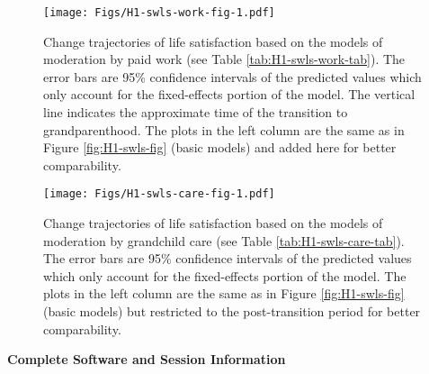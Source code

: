 \documentclass[
  english,
  man, noextraspace]{apa7}
\begin{document}
\begin{appendix}
\begin{figure}
\centering
\texttt{[image: Figs/H1-swls-work-fig-1.pdf]}
\caption{\label{fig:H1-swls-work-fig}Change trajectories of life satisfaction
based on the models of moderation by paid work (see Table
\ref{tab:H1-swls-work-tab}). The error bars are 95\% confidence
intervals of the predicted values which only account for the
fixed-effects portion of the model. The vertical line indicates the
approximate time of the transition to grandparenthood. The plots in the
left column are the same as in Figure \ref{fig:H1-swls-fig} (basic
models) and added here for better comparability.}
\end{figure}









\begin{figure}
\centering
\texttt{[image: Figs/H1-swls-care-fig-1.pdf]}
\caption{\label{fig:H1-swls-care-fig}Change trajectories of life satisfaction
based on the models of moderation by grandchild care (see Table
\ref{tab:H1-swls-care-tab}). The error bars are 95\% confidence
intervals of the predicted values which only account for the
fixed-effects portion of the model. The plots in the left column are the
same as in Figure \ref{fig:H1-swls-fig} (basic models) but restricted to
the post-transition period for better comparability.}
\end{figure}

\newpage

\noindent  \textbf{Complete Software and Session Information}


\end{appendix}
\end{document}
